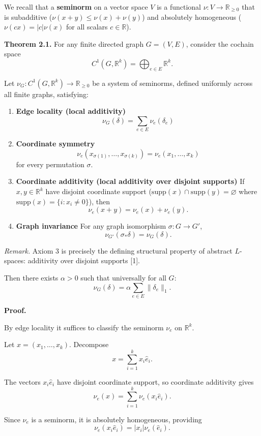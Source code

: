 \documentclass[
]{article}
\providecommand{\tightlist}{%
  \setlength{\itemsep}{0pt}\setlength{\parskip}{0pt}}
\begin{document}
We recall that a \textbf{seminorm} on a vector space \(V\) is a
functional \(\nu: V \to \mathbb{R}_{\ge0}\) that is subadditive
(\(\nu(x+y) \le \nu(x) + \nu(y)\)) and absolutely homogeneous
(\(\nu(cx) = |c|\nu(x)\) for all scalars \(c \in \mathbb{R}\)).

\textbf{Theorem 2.1.} For any finite directed graph \(G=(V,E)\),
consider the cochain space
\[ C^1(G,\mathbb{R}^k)=\bigoplus_{e\in E}\mathbb{R}^k. \]

Let \(\nu_G:C^1(G,\mathbb{R}^k)\to\mathbb{R}_{\ge0}\) be a system of
seminorms, defined uniformly across all finite graphs, satisfying:

\begin{enumerate}
\def\labelenumi{\arabic{enumi}.}
\tightlist
\item
  \textbf{Edge locality (local additivity)}
  \[ \nu_G(\delta)=\sum_{e\in E}\nu_e(\delta_e) \]
\item
  \textbf{Coordinate symmetry}
  \[ \nu_e(x_{\sigma(1)},\dots,x_{\sigma(k)}) = \nu_e(x_1,\dots,x_k) \]
  for every permutation \(\sigma\).
\item
  \textbf{Coordinate additivity (local additivity over disjoint
  supports)} If \(x,y\in\mathbb{R}^k\) have disjoint coordinate support
  (\(\mathrm{supp}(x) \cap \mathrm{supp}(y) = \varnothing\) where
  \(\mathrm{supp}(x) = \{i : x_i \neq 0\}\)), then
  \[ \nu_e(x+y)=\nu_e(x)+\nu_e(y). \]
\item
  \textbf{Graph invariance} For any graph isomorphism
  \(\sigma:G\to G'\), \[ \nu_{G'}(\sigma_*\delta)=\nu_G(\delta). \]
\end{enumerate}

\emph{Remark.} Axiom 3 is precisely the defining structural property of
abstract \(L\)-spaces: additivity over disjoint supports {[}1{]}.

Then there exists \(\alpha > 0\) such that universally for all \(G\):
\[ \nu_G(\delta)=\alpha\sum_{e\in E}\|\delta_e\|_1. \]

\textbf{Proof.}

By edge locality it suffices to classify the seminorm \(\nu_e\) on
\(\mathbb{R}^k\).

Let \(x=(x_1,\dots,x_k)\). Decompose \[ x=\sum_{i=1}^k x_i \hat{e}_i. \]

The vectors \(x_i \hat{e}_i\) have disjoint coordinate support, so
coordinate additivity gives
\[ \nu_e(x)=\sum_{i=1}^k\nu_e(x_i \hat{e}_i). \]

Since \(\nu_e\) is a seminorm, it is absolutely homogeneous, providing
\[ \nu_e(x_i \hat{e}_i)=|x_i|\nu_e(\hat{e}_i). \]
\end{document}
